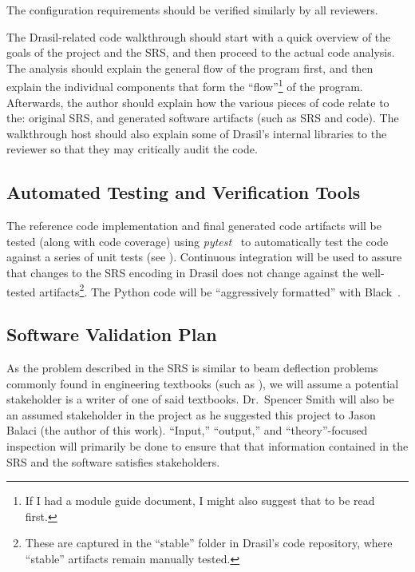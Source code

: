 \documentclass[12pt, titlepage]{article}
\begin{document}
The configuration requirements should be verified similarly by all reviewers.

The Drasil-related code walkthrough should start with a quick overview of the
goals of the project and the SRS, and then proceed to the actual code analysis.
The analysis should explain the general flow of the program first, and then
explain the individual components that form the ``flow''\footnote{If I had a
module guide document, I might also suggest that to be read first.} of the
program. Afterwards, the author should explain how the various pieces of code
relate to the: original SRS, and generated software artifacts (such as SRS and
code). The walkthrough host should also explain some of Drasil's internal
libraries to the reviewer so that they may critically audit the code.

\subsection{Automated Testing and Verification Tools}

The reference code implementation and final generated code artifacts will be
tested (along with code coverage) using \textit{pytest}~\cite{PyTest} to
automatically test the code against a series of unit tests (see
). Continuous integration will be used to assure
that changes to the SRS encoding in Drasil does not change against the
well-tested artifacts\footnote{These are captured in the ``stable'' folder in
    Drasil's code repository, where ``stable'' artifacts remain manually tested.}.
The Python code will be ``aggressively formatted'' with
Black~\cite{PythonBlack}.

\subsection{Software Validation Plan}

As the problem described in the SRS is similar to beam deflection problems
commonly found in engineering textbooks (such as \cite{BeerJohnston1981}), we
will assume a potential stakeholder is a writer of one of said textbooks.
Dr.~Spencer Smith will also be an assumed stakeholder in the project as he
suggested this project to Jason Balaci (the author of this work). ``Input,''
``output,'' and ``theory''-focused inspection will primarily be done to ensure
that that information contained in the SRS and the software satisfies
stakeholders.

\newpage{}
\end{document}
